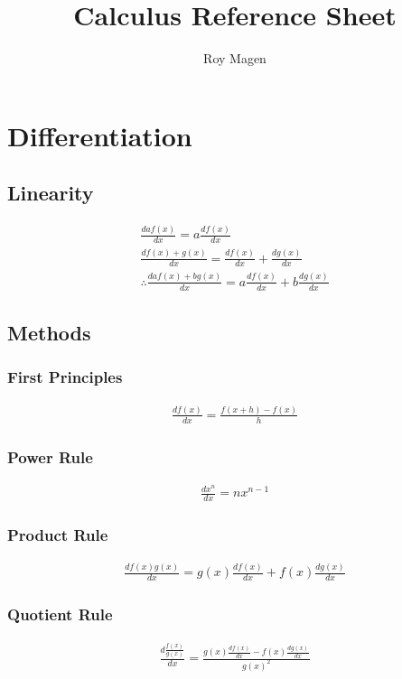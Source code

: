 \documentclass[12pt]{article}
\title{Calculus Reference Sheet}
\author{Roy Magen}
\date{ }
\begin{document}
	\newcommand{\deriv}[2][x]{\frac{d #2}{d #1}}
	\newcommand{\antider}[2][x]{\int #2\,d#1}
	\newcommand{\defint}[4][x]{\int_#2^#3 #4 d#1}

	\maketitle
	
	\tableofcontents

	\section{Differentiation}
		\subsection{Linearity}
			\begin{gather}
				\deriv{af(x)} = a\deriv{f(x)} \\
				\deriv{f(x) + g(x)} = \deriv{f(x)} +
				\deriv{g(x)} \\
				\therefore \deriv{af(x) + bg(x)} = a\deriv{f(x)}
				+ b\deriv{g(x)}
			\end{gather}
		\subsection{Methods}
			\subsubsection{First Principles}
				\begin{gather}
					\deriv{f(x)} = \frac{f(x + h) -
					f(x)}{h}
				\end{gather}
			\subsubsection{Power Rule}
				\begin{gather}
					\deriv{x^n} = nx^{n-1}
				\end{gather}
			\subsubsection{Product Rule}
				\begin{gather}
					\deriv{f(x)g(x)} = g(x)\deriv{f(x)} +
					f(x)\deriv{g(x)}
				\end{gather}
			\subsubsection{Quotient Rule}
				\begin{gather}
					\deriv{\frac{f(x)}{g(x)}} =
					\frac{g(x)\deriv{f(x)} -
					f(x)\deriv{g(x)}}{g(x)^2}
				\end{gather}
\end{document}
